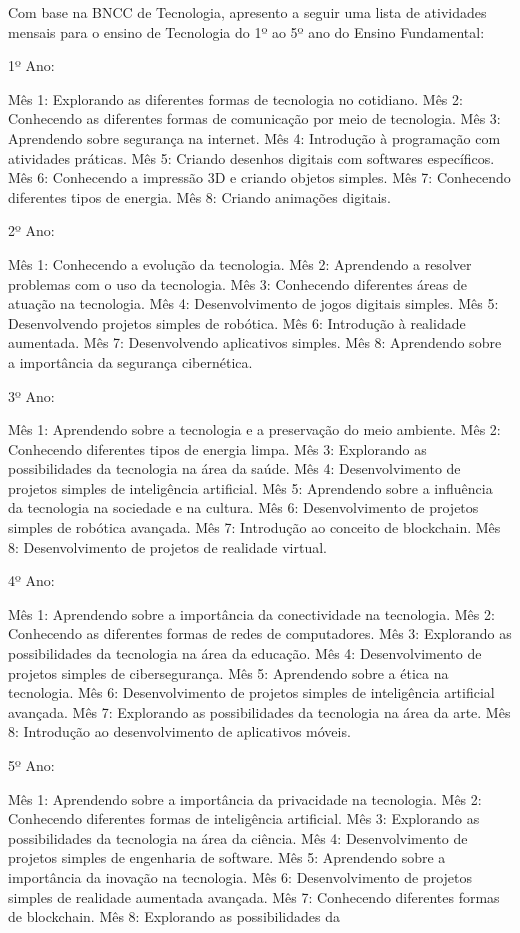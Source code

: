 Com base na BNCC de Tecnologia, apresento a seguir uma lista de atividades mensais para o ensino de Tecnologia do 1º ao 5º ano do Ensino Fundamental:

1º Ano:

Mês 1: Explorando as diferentes formas de tecnologia no cotidiano.
Mês 2: Conhecendo as diferentes formas de comunicação por meio de tecnologia.
Mês 3: Aprendendo sobre segurança na internet.
Mês 4: Introdução à programação com atividades práticas.
Mês 5: Criando desenhos digitais com softwares específicos.
Mês 6: Conhecendo a impressão 3D e criando objetos simples.
Mês 7: Conhecendo diferentes tipos de energia.
Mês 8: Criando animações digitais.

2º Ano:

Mês 1: Conhecendo a evolução da tecnologia.
Mês 2: Aprendendo a resolver problemas com o uso da tecnologia.
Mês 3: Conhecendo diferentes áreas de atuação na tecnologia.
Mês 4: Desenvolvimento de jogos digitais simples.
Mês 5: Desenvolvendo projetos simples de robótica.
Mês 6: Introdução à realidade aumentada.
Mês 7: Desenvolvendo aplicativos simples.
Mês 8: Aprendendo sobre a importância da segurança cibernética.

3º Ano:

Mês 1: Aprendendo sobre a tecnologia e a preservação do meio ambiente.
Mês 2: Conhecendo diferentes tipos de energia limpa.
Mês 3: Explorando as possibilidades da tecnologia na área da saúde.
Mês 4: Desenvolvimento de projetos simples de inteligência artificial.
Mês 5: Aprendendo sobre a influência da tecnologia na sociedade e na cultura.
Mês 6: Desenvolvimento de projetos simples de robótica avançada.
Mês 7: Introdução ao conceito de blockchain.
Mês 8: Desenvolvimento de projetos de realidade virtual.

4º Ano:

Mês 1: Aprendendo sobre a importância da conectividade na tecnologia.
Mês 2: Conhecendo as diferentes formas de redes de computadores.
Mês 3: Explorando as possibilidades da tecnologia na área da educação.
Mês 4: Desenvolvimento de projetos simples de cibersegurança.
Mês 5: Aprendendo sobre a ética na tecnologia.
Mês 6: Desenvolvimento de projetos simples de inteligência artificial avançada.
Mês 7: Explorando as possibilidades da tecnologia na área da arte.
Mês 8: Introdução ao desenvolvimento de aplicativos móveis.

5º Ano:

Mês 1: Aprendendo sobre a importância da privacidade na tecnologia.
Mês 2: Conhecendo diferentes formas de inteligência artificial.
Mês 3: Explorando as possibilidades da tecnologia na área da ciência.
Mês 4: Desenvolvimento de projetos simples de engenharia de software.
Mês 5: Aprendendo sobre a importância da inovação na tecnologia.
Mês 6: Desenvolvimento de projetos simples de realidade aumentada avançada.
Mês 7: Conhecendo diferentes formas de blockchain.
Mês 8: Explorando as possibilidades da

